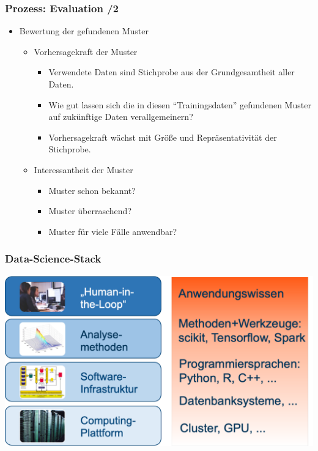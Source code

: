 
\begin{frame}
\frametitle{Prozess: Evaluation /2}

\begin{itemize}
\item Bewertung der gefundenen Muster
\begin{itemize}
\item Vorhersagekraft der Muster
\begin{itemize}
\item Verwendete Daten sind Stichprobe aus der Grundgesamtheit aller Daten.
\item Wie gut lassen sich die in diesen "`Trainingsdaten"' gefundenen
  Muster auf zukünftige Daten verallgemeinern?
\item Vorhersagekraft wächst mit Größe und Repräsentativität der Stichprobe.
\end{itemize}
\item Interessantheit der Muster
\begin{itemize}
\item Muster schon bekannt?
\item Muster überraschend?
\item Muster für viele Fälle anwendbar?
\end{itemize}
\end{itemize}
\end{itemize}

\end{frame}


\begin{frame}
  \frametitle{Data-Science-Stack}

  \begin{center}
    \includegraphics[scale=.6]{fig1/ds-stack.pdf}
    \end{center}

\end{frame}


